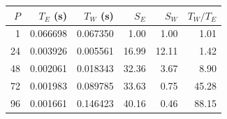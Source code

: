 \begin{center}
\small
\begin{tabular}{rrrrrr}
\toprule
$P$ & $T_E$ (s) & $T_W$ (s) & $S_E$ & $S_W$ & $T_W/T_E$ \\
\midrule
1 & 0.066698 & 0.067350 & 1.00 & 1.00 & 1.01 \\
24 & 0.003926 & 0.005561 & 16.99 & 12.11 & 1.42 \\
48 & 0.002061 & 0.018343 & 32.36 & 3.67 & 8.90 \\
72 & 0.001983 & 0.089785 & 33.63 & 0.75 & 45.28 \\
96 & 0.001661 & 0.146423 & 40.16 & 0.46 & 88.15 \\
\bottomrule
\end{tabular}
\end{center}
